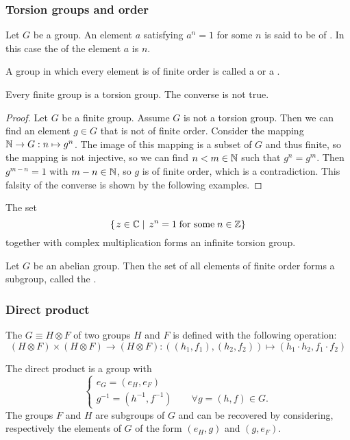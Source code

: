 \subsubsection{Torsion groups and order}
\begin{definition}
Let $G$ be a group. An element $a$ satisfying $a^n = 1$ for some $n$ is said to be of . In this case the  of the element $a$ is $n$.

A group in which every element is of finite order is called a  or a .
\end{definition}
\begin{lemma}
Every finite group is a torsion group. The converse is not true.
\end{lemma}
\begin{proof}
Let $G$ be a finite group. Assume $G$ is not a torsion group. Then we can find an element $g\in G$ that is not of finite order. Consider the mapping $\mathbb{N} \to G: n\mapsto g^n$. The image of this mapping is a subset of $G$ and thus finite, so the mapping is not injective, so we can find $n<m\in\mathbb{N}$ such that $g^n = g^m$. Then $g^{m-n}=1$ with $m-n\in \mathbb{N}$, so $g$ is of finite order, which is a contradiction. This falsity of the converse is shown by the following examples.
\end{proof}

\begin{example}
The set
\[ \left\{\left. z\in \mathbb{C} \;\right|\; z^n = 1\;\text{for some}\; n\in \mathbb{Z} \right\} \]
together with complex multiplication forms an infinite torsion group.
\end{example}

\begin{lemma}
Let $G$ be an abelian group. Then the set of all elements of finite order forms a subgroup, called the .
\end{lemma}

\subsubsection{Direct product}
\begin{definition}
The  $G \equiv H\otimes F$ of two groups $H$ and $F$ is defined with the following operation:
\[ (H\otimes F) \times (H\otimes F) \rightarrow (H\otimes F): ((h_1,f_1),(h_2,f_2)) \mapsto (h_1\cdot h_2, f_1\cdot f_2)\]
\end{definition}
The direct product is a group with
\[ \begin{cases}
e_G = (e_H,e_F) \\
g^{-1} = (h^{-1}, f^{-1})\qquad \forall g = (h,f) \in G.
\end{cases} \]
The groups $F$ and $H$ are subgroups of $G$ and can be recovered by considering, respectively the elements of $G$ of the form $(e_H, g)$ and $(g ,e_F)$.

